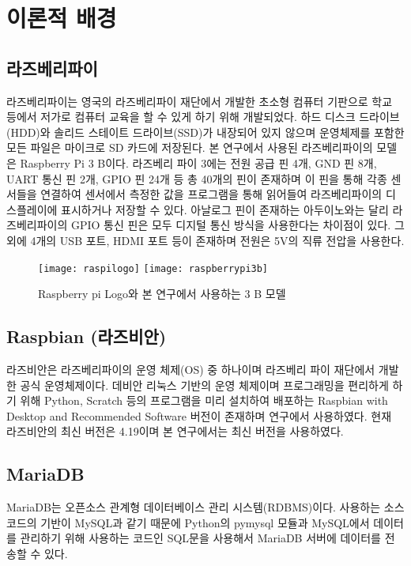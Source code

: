 \section{이론적 배경}

\subsection{라즈베리파이}

라즈베리파이는 영국의 라즈베리파이 재단에서 개발한 초소형 컴퓨터 기판으로 학교 등에서 저가로 컴퓨터 교육을 할 수 있게 하기 위해 개발되었다. 하드 디스크 드라이브(HDD)와 솔리드 스테이트 드라이브(SSD)가 내장되어 있지 않으며 운영체제를 포함한 모든 파일은 마이크로 SD 카드에 저장된다. 본 연구에서 사용된 라즈베리파이의 모델은 Raspberry Pi 3 B이다. 라즈베리 파이 3에는 전원 공급 핀 4개, GND 핀 8개, UART 통신 핀 2개, GPIO 핀 24개 등 총 40개의 핀이 존재하며 이 핀을 통해 각종 센서들을 연결하여 센서에서 측정한 값을 프로그램을 통해 읽어들여 라즈베리파이의 디스플레이에 표시하거나 저장할 수 있다. 아날로그 핀이 존재하는 아두이노와는 달리 라즈베리파이의 GPIO 통신 핀은 모두 디지털 통신 방식을 사용한다는 차이점이 있다. 그 외에 4개의 USB 포트, HDMI 포트 등이 존재하며 전원은 5V의 직류 전압을 사용한다.

\begin{figure}[htbp]
	\centering
	\texttt{[image: raspilogo]}
	\texttt{[image: raspberrypi3b]}
	\caption{Raspberry pi Logo와 본 연구에서 사용하는 3 B 모델}
	\label{RASPI}
\end{figure}

\subsection{Raspbian (라즈비안)}
라즈비안은 라즈베리파이의 운영 체제(OS) 중 하나이며 라즈베리 파이 재단에서 개발한 공식 운영체제이다. 데비안 리눅스 기반의 운영 체제이며 프로그래밍을 편리하게 하기 위해 Python, Scratch 등의 프로그램을 미리 설치하여 배포하는 Raspbian with Desktop and Recommended Software 버전이 존재하며 연구에서 사용하였다. 현재 라즈비안의 최신 버전은 4.19이며 본 연구에서는 최신 버전을 사용하였다.

\subsection{MariaDB}
MariaDB는 오픈소스 관계형 데이터베이스 관리 시스템(RDBMS)이다. 사용하는 소스 코드의 기반이 MySQL과 같기 때문에 Python의 pymysql 모듈과 MySQL에서 데이터를 관리하기 위해 사용하는 코드인 SQL문을 사용해서 MariaDB 서버에 데이터를 전송할 수 있다.

